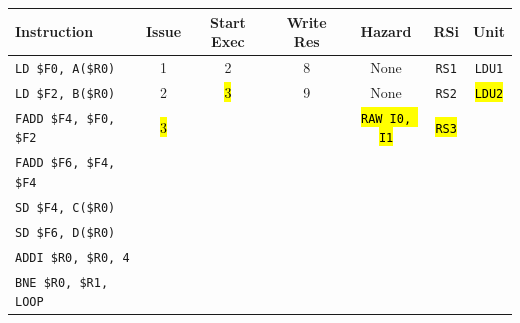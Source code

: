 \begin{enumerate}
    \begin{table}[!htp]
        \centering
        \begin{adjustbox}{width={\textwidth},totalheight={\textheight},keepaspectratio}
        \begin{tabular}{@{} l c c c c c c @{}}
            \toprule
            \textbf{Instruction} & \textbf{Issue} & \textbf{Start Exec} & \textbf{Write Res} & \textbf{Hazard} & \textbf{RSi} & \textbf{Unit} \\
            \midrule
            \texttt{LD \$F0, A(\$R0)}       & 1 & 2 & 8 & None  & \texttt{RS1}   & \texttt{LDU1}  \\ [.5em]
            \texttt{LD \$F2, B(\$R0)}       & 2 & \hl{3} & 9 & None  & \texttt{RS2}   & \hl{\texttt{LDU2}}  \\ [.5em]
            \texttt{FADD \$F4, \$F0, \$F2}  & \hl{3} &   &   & \hl{\texttt{RAW I0, I1}} & \hl{\texttt{RS3}} &       \\ [.5em]
            \texttt{FADD \$F6, \$F4, \$F4}  &   &   &   &       &       &       \\ [.5em]
            \texttt{SD \$F4, C(\$R0)}       &   &   &   &       &       &       \\ [.5em]
            \texttt{SD \$F6, D(\$R0)}       &   &   &   &       &       &       \\ [.5em]
            \texttt{ADDI \$R0, \$R0, 4}     &   &   &   &       &       &       \\ [.5em]
            \texttt{BNE \$R0, \$R1, LOOP}   &   &   &   &       &       &       \\
            \bottomrule
        \end{tabular}
        \end{adjustbox}
    \end{table}
    

\end{enumerate}
